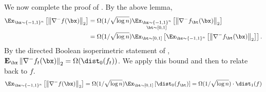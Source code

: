 We now complete the proof of . By the above lemma,
\begin{align*}
\Ex_{\bx\sim\{-1,1\}^n}\left[ \norm{\grad^- f(\bx)}_2\right] &= \Omega(1/\sqrt{\log n}) \Ex_{\substack{\bx \sim \{-1,1\}^n \\ \bt \sim [0,1]}} \left[ \norm{\grad^- f_{\bt}(\bx)}_2\right] \\
    &= \Omega(1/\sqrt{\log n}) \Ex_{\bt \sim [0,1]} \left[  \Ex_{\bx\sim\{-1,1\}^n}\left[ \norm{\grad^- f_{\bt}(\bx)}_2 \right] \right].
\end{align*}
By the directed Boolean isoperimetric statement of , $\Exp_{\bx} \norm{\grad^- f_t(\bx)}_2 = \Omega(\dist_0(f_t))$.
We apply this bound and then  to relate back to $f$.
\begin{align*}
\Ex_{\bx\sim\{-1,1\}^n}\left[ \norm{\grad^- f(\bx)}_2 \right] = \Omega(1/\sqrt{\log n}) \Ex_{\bt\sim[0,1]} \left[\dist_0(f_{\bt})\right] = \Omega(1/\sqrt{\log n}) \cdot \dist_1(f)
\end{align*}
